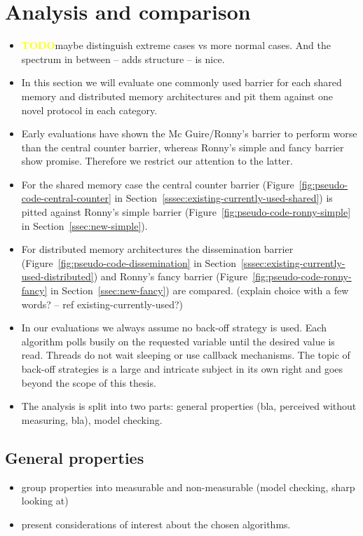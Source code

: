 \documentclass[a4paper, 10pt]{article}
\def \todo{\textbf{\textcolor{yellow}{TODO}}}
\begin{document}
\section{Analysis and comparison}
\label{sec:analysis}
\begin{itemize}
	\item \todo maybe distinguish extreme cases vs more normal cases. And the spectrum in between -- adds structure -- is nice.
	\item In this section we will evaluate one commonly used barrier for each shared memory and distributed memory architectures and pit them against one novel protocol in each category.
	\item Early evaluations have shown the Mc Guire/Ronny's barrier to perform worse than the central counter barrier, whereas Ronny's simple and fancy barrier show promise. Therefore we restrict our attention to the latter.
	\item For the shared memory case the central counter barrier (Figure~\ref{fig:pseudo-code-central-counter} in Section~\ref{sssec:existing-currently-used-shared}) is pitted against Ronny's simple barrier (Figure~\ref{fig:pseudo-code-ronny-simple} in Section~\ref{ssec:new-simple}).
	\item For distributed memory architectures the dissemination barrier (Figure~\ref{fig:pseudo-code-dissemination} in Section~\ref{sssec:existing-currently-used-distributed}) and Ronny's fancy barrier (Figure~\ref{fig:pseudo-code-ronny-fancy} in Section~\ref{ssec:new-fancy}) are compared. (explain choice with a few words? -- ref existing-currently-used?)
	\item In our evaluations we always assume no back-off strategy is used. Each algorithm polls busily on the requested variable until the desired value is read. Threads do not wait sleeping or use callback mechanisms. The topic of back-off strategies is a large and intricate subject in its own right and goes beyond the scope of this thesis.
	\item The analysis is split into two parts: general properties (bla, perceived without measuring, bla), model checking.
\end{itemize}

\subsection{General properties}
\label{ssec:analysis-general}
\begin{itemize}
	\item group properties into measurable and non-measurable (model checking, sharp looking at)
	\item present considerations of interest about the chosen algorithms.
\end{itemize}
\end{document}
